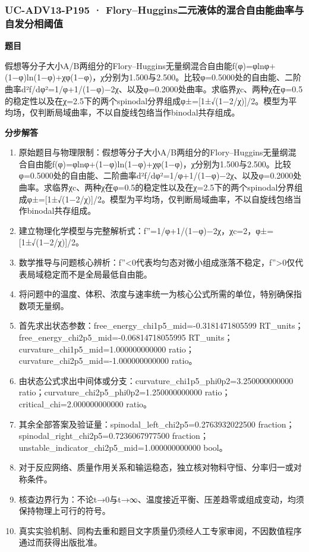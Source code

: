 \documentclass[UTF8,11pt,a4paper]{ctexart}
\begin{document}
\subsubsection*{UC-ADV13-P195 · Flory–Huggins二元液体的混合自由能曲率与自发分相阈值}
\noindent\textbf{题目}\par
假想等分子大小A/B两组分的Flory–Huggins无量纲混合自由能f(φ)=φlnφ+(1−φ)ln(1−φ)+χφ(1−φ)，χ分别为1.500与2.500。比较φ=0.5000处的自由能、二阶曲率d²f/dφ²=1/φ+1/(1−φ)−2χ、以及φ=0.2000处曲率。求临界χc、两种χ在φ=0.5的稳定性以及在χ=2.5下的两个spinodal分界组成φ±=[1±√(1−2/χ)]/2。模型为平均场，仅判断局域曲率，不以自旋线包络当作binodal共存组成。\par
\medskip\noindent\textbf{分步解答}
\begin{enumerate}
\item 原始题目与物理限制：假想等分子大小A/B两组分的Flory–Huggins无量纲混合自由能f(φ)=φlnφ+(1−φ)ln(1−φ)+χφ(1−φ)，χ分别为1.500与2.500。比较φ=0.5000处的自由能、二阶曲率d²f/dφ²=1/φ+1/(1−φ)−2χ、以及φ=0.2000处曲率。求临界χc、两种χ在φ=0.5的稳定性以及在χ=2.5下的两个spinodal分界组成φ±=[1±√(1−2/χ)]/2。模型为平均场，仅判断局域曲率，不以自旋线包络当作binodal共存组成。
\item 建立物理化学模型与完整解析式：f''=1/φ+1/(1−φ)−2χ，χc=2，φ±=[1±√(1−2/χ)]/2。
\item 数学推导与问题核心辨析：f''<0代表均匀态对微小组成涨落不稳定，f''>0仅代表局域稳定而不是全局最低自由能。
\item 将问题中的温度、体积、浓度与速率统一为核心公式所需的单位，特别确保指数项无量纲。
\item 首先求出状态参数：free\_energy\_chi1p5\_mid=-0.3181471805599 RT\_units；free\_energy\_chi2p5\_mid=-0.06814718055995 RT\_units；curvature\_chi1p5\_mid=1.000000000000 ratio；curvature\_chi2p5\_mid=-1.000000000000 ratio。
\item 由状态公式求出中间体或分支：curvature\_chi1p5\_phi0p2=3.250000000000 ratio；curvature\_chi2p5\_phi0p2=1.250000000000 ratio；critical\_chi=2.000000000000 ratio。
\item 其余全部答案及验证量：spinodal\_left\_chi2p5=0.2763932022500 fraction；spinodal\_right\_chi2p5=0.7236067977500 fraction；unstable\_indicator\_chi2p5\_mid=1.000000000000 bool。
\item 对于反应网络、质量作用关系和输运稳态，独立核对物料守恒、分率归一或对称条件。
\item 核查边界行为：不论t→0与t→∞、温度接近平衡、压差趋零或组成变动，均须保持物理上可行的符号。
\item 真实实验机制、同构去重和题目文字质量仍须经人工专家审阅，不因数值程序通过而获得出版批准。
\end{enumerate}
\end{document}
